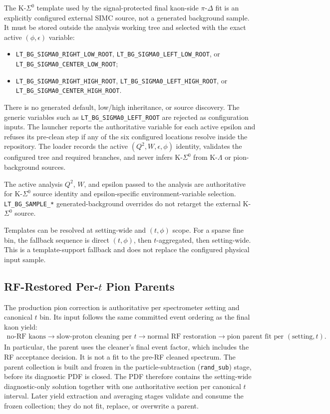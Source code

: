 \documentclass[11pt]{article}
\begin{document}
The K-$\Sigma^0$ template used by the signal-protected final kaon-side
$\pi$-$\Delta$ fit is an explicitly configured external SIMC source, not a
generated background sample.  It must be stored outside the analysis working
tree and selected with the exact active $(\phi,\epsilon)$ variable:
\begin{itemize}[leftmargin=2em]
  \item \texttt{LT\_BG\_SIGMA0\_RIGHT\_LOW\_ROOT},
        \texttt{LT\_BG\_SIGMA0\_LEFT\_LOW\_ROOT}, or
        \texttt{LT\_BG\_SIGMA0\_CENTER\_LOW\_ROOT};
  \item \texttt{LT\_BG\_SIGMA0\_RIGHT\_HIGH\_ROOT},
        \texttt{LT\_BG\_SIGMA0\_LEFT\_HIGH\_ROOT}, or
        \texttt{LT\_BG\_SIGMA0\_CENTER\_HIGH\_ROOT}.
\end{itemize}
There is no generated default, low/high inheritance, or source discovery.
The generic variables such as \texttt{LT\_BG\_SIGMA0\_LEFT\_ROOT} are
rejected as configuration inputs.  The launcher reports the authoritative
variable for each active epsilon and refuses its pre-clean step if any of the
six configured locations resolve inside the repository.  The loader records
the active $(Q^2,W,\epsilon,\phi)$ identity, validates the configured tree and
required branches, and never infers K-$\Sigma^0$ from K-$\Lambda$ or
pion-background sources.

The active analysis $Q^2$, $W$, and epsilon passed to the analysis are
authoritative for K-$\Sigma^0$ source identity and epsilon-specific
environment-variable selection.  \texttt{LT\_BG\_SAMPLE\_*} generated-background
overrides do not retarget the external K-$\Sigma^0$ source.

Templates can be resolved at setting-wide and $(t,\phi)$ scope.  For a sparse
fine bin, the fallback sequence is direct $(t,\phi)$, then $t$-aggregated, then
setting-wide.  This is a template-support fallback and does not replace the
configured physical input sample.

\subsection{RF-Restored Per-$t$ Pion Parents}

The production pion correction is authoritative per spectrometer setting and
canonical $t$ bin.  Its input follows the same committed event ordering as the
final kaon yield:
\begin{align}
  \text{no-RF kaons}
  \to\text{slow-proton cleaning per }t
  \to\text{normal RF restoration}
  \to\text{pion parent fit per }(\mathrm{setting},t).
\end{align}
In particular, the parent uses the cleaner's final event factor, which includes
the RF acceptance decision.  It is not a fit to the pre-RF cleaned spectrum.
The parent collection is built and frozen in the particle-subtraction
(\texttt{rand\_sub}) stage, before its diagnostic PDF is closed.  The PDF
therefore contains the setting-wide diagnostic-only solution together with one
authoritative section per canonical $t$ interval.  Later yield extraction and
averaging stages validate and consume the frozen collection; they do not fit,
replace, or overwrite a parent.
\end{document}
